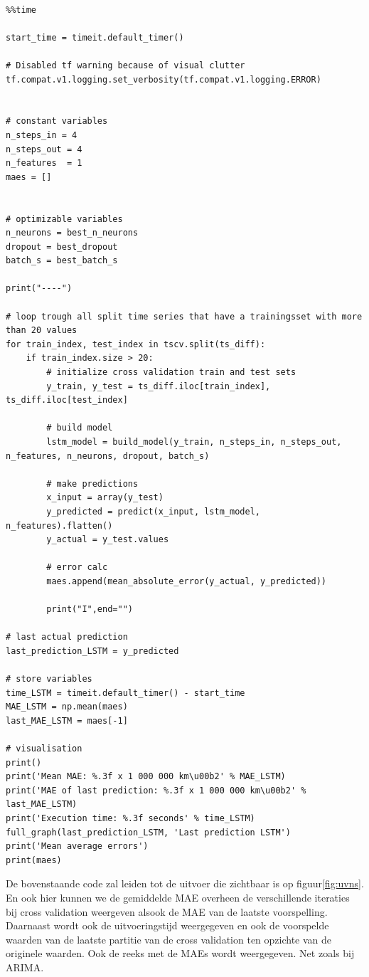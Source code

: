 \begin{verbatim}

%%time

start_time = timeit.default_timer()

# Disabled tf warning because of visual clutter
tf.compat.v1.logging.set_verbosity(tf.compat.v1.logging.ERROR)


# constant variables
n_steps_in = 4
n_steps_out = 4
n_features  = 1
maes = []


# optimizable variables
n_neurons = best_n_neurons
dropout = best_dropout
batch_s = best_batch_s

print("----")

# loop trough all split time series that have a trainingsset with more than 20 values
for train_index, test_index in tscv.split(ts_diff):
    if train_index.size > 20:  
        # initialize cross validation train and test sets
        y_train, y_test = ts_diff.iloc[train_index], ts_diff.iloc[test_index]
        
        # build model
        lstm_model = build_model(y_train, n_steps_in, n_steps_out, n_features, n_neurons, dropout, batch_s)
        
        # make predictions
        x_input = array(y_test)
        y_predicted = predict(x_input, lstm_model, n_features).flatten()
        y_actual = y_test.values
        
        # error calc
        maes.append(mean_absolute_error(y_actual, y_predicted))
        
        print("I",end="")
    
# last actual prediction 
last_prediction_LSTM = y_predicted

# store variables
time_LSTM = timeit.default_timer() - start_time
MAE_LSTM = np.mean(maes)
last_MAE_LSTM = maes[-1]

# visualisation
print()
print('Mean MAE: %.3f x 1 000 000 km\u00b2' % MAE_LSTM)
print('MAE of last prediction: %.3f x 1 000 000 km\u00b2' % last_MAE_LSTM)
print('Execution time: %.3f seconds' % time_LSTM)
full_graph(last_prediction_LSTM, 'Last prediction LSTM')
print('Mean average errors')
print(maes)
\end{verbatim}

De bovenstaande code zal leiden tot de uitvoer die zichtbaar is op figuur\ref{fig:uvns}. En ook hier kunnen we de gemiddelde MAE overheen de verschillende iteraties bij cross validation weergeven alsook de MAE van de laatste voorspelling. Daarnaast wordt ook de uitvoeringstijd weergegeven en ook de voorspelde waarden van de laatste partitie van de cross validation ten opzichte van de originele waarden. Ook de reeks met de MAEs wordt weergegeven. Net zoals bij ARIMA.

